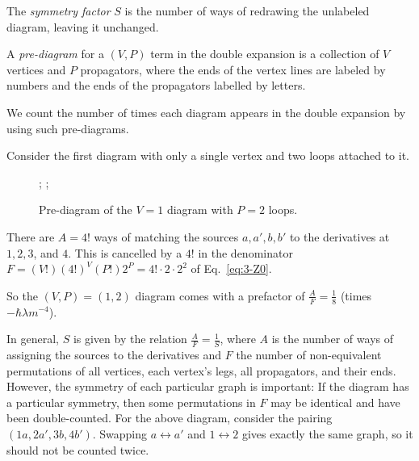 \begin{definition}
  The \emph{symmetry factor} $S$ is the number of ways of redrawing the unlabeled diagram, leaving it unchanged.
\end{definition}

\begin{definition}
  A \emph{pre-diagram} for a $(V, P)$ term in the double expansion is a collection of $V$ vertices and $P$ propagators, where the ends of the vertex lines are labeled by numbers and the ends of the propagators labelled by letters.
\end{definition}
We count the number of times each diagram appears in the double expansion by using such pre-diagrams.

\begin{example}[$V = 1$]
  Consider the first diagram with only a single vertex and two loops attached to it.
  \begin{figure}[tbhp]
    \centering
    ;
    \qquad
    ;
    \caption{Pre-diagram of the $V = 1$ diagram with $P = 2$ loops.}
    \label{fig:l3f2}
  \end{figure}
  There are $A = 4!$ ways of matching the sources $a, a', b, b'$ to the derivatives at $1, 2, 3$, and $4$.
  This is cancelled by a $4!$ in the denominator $F = (V!) (4!)^V (P!) 2^P = 4! \cdot 2 \cdot 2^2$ of Eq.~\eqref{eq:3-Z0}.

  So the $(V, P)= (1, 2)$ diagram comes with a prefactor of $\frac{A}{F} = \frac{1}{8}$ (times $-\hbar \lambda m^{-4}$). 
\end{example}

In general, $S$ is given by the relation $\frac{A}{F} = \frac{1}{S}$, where $A$ is the number of ways of assigning the sources to the derivatives and $F$ the number of non-equivalent permutations of all vertices, each vertex's legs, all propagators, and their ends.
However, the symmetry of each particular graph is important: If the diagram has a particular symmetry, then some permutations in $F$ may be identical and have been double-counted.
For the above diagram, consider the pairing $(1a, 2a', 3b, 4b')$. Swapping $a \leftrightarrow a'$ and $1 \leftrightarrow 2$ gives exactly the same graph, so it should not be counted twice.

